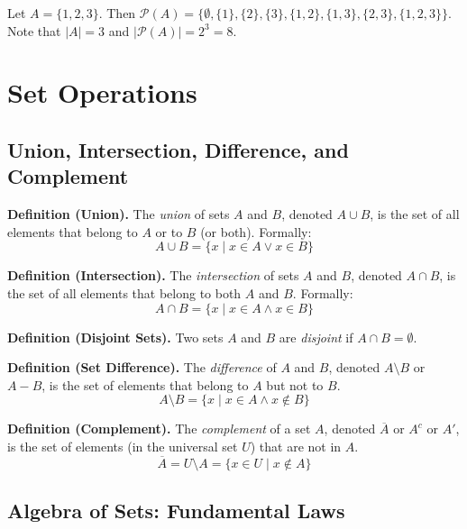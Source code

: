 \documentclass[11pt,a4paper]{article}
\begin{document}
\begin{example}
Let $A = \{1, 2, 3\}$. Then $\mathcal{P}(A) = \{\emptyset, \{1\}, \{2\}, \{3\}, \{1,2\}, \{1,3\}, \{2,3\}, \{1,2,3\}\}$. Note that $|A| = 3$ and $|\mathcal{P}(A)| = 2^3 = 8$.
\end{example}

\section{Set Operations}

\subsection{Union, Intersection, Difference, and Complement}

\textbf{Definition (Union).} The \textit{union} of sets $A$ and $B$, denoted $A \cup B$, is the set of all elements that belong to $A$ or to $B$ (or both). Formally:
\begin{equation*}
    A \cup B = \{x \mid x \in A \lor x \in B\}
\end{equation*}

\textbf{Definition (Intersection).} The \textit{intersection} of sets $A$ and $B$, denoted $A \cap B$, is the set of all elements that belong to both $A$ and $B$. Formally:
\begin{equation*}
    A \cap B = \{x \mid x \in A \land x \in B\}
\end{equation*}

\textbf{Definition (Disjoint Sets).} Two sets $A$ and $B$ are \textit{disjoint} if $A \cap B = \emptyset$.

\textbf{Definition (Set Difference).} The \textit{difference} of $A$ and $B$, denoted $A \setminus B$ or $A - B$, is the set of elements that belong to $A$ but not to $B$.
\begin{equation*}
    A \setminus B = \{x \mid x \in A \land x \notin B\}
\end{equation*}

\textbf{Definition (Complement).} The \textit{complement} of a set $A$, denoted $\overline{A}$ or $A^c$ or $A'$, is the set of elements (in the universal set $U$) that are not in $A$.
\begin{equation*}
    \overline{A} = U \setminus A = \{x \in U \mid x \notin A\}
\end{equation*}

\subsection{Algebra of Sets: Fundamental Laws}
\end{document}
